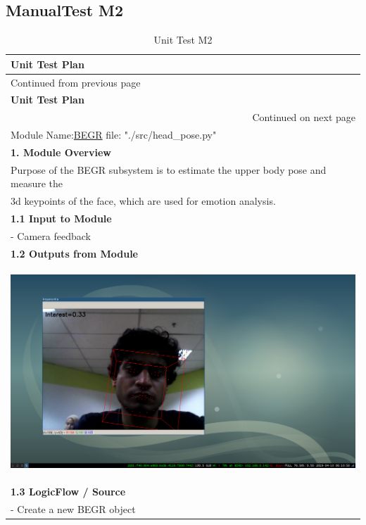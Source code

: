 \documentclass[12pt,a4paper,man]{report}
\begin{document}
\subsection{ManualTest M2}
\label{sec:orgb96a139}
\begin{longtable}{|p{7in}|}
\caption{\label{table:utest_m2}
Unit Test M2}
\\
\hline
\textbf{Unit Test Plan} \cellcolor{blue!25}\\
\hline
\endfirsthead
\multicolumn{1}{l}{Continued from previous page} \\
\hline

\textbf{Unit Test Plan} \cellcolor{blue!25} \\

\hline
\endhead
\hline\multicolumn{1}{r}{Continued on next page} \\
\endfoot
\endlastfoot
\hline
\hline
Module Name:\underline{BEGR} \hspace{2in}  file:  "./src/head\_pose.py"\\
\hline
\textbf{1. Module Overview}\\
\hline
Purpose of the BEGR subsystem is to estimate the upper body pose and measure the\\
3d keypoints of the face, which are used for emotion analysis.\\
\hline
\textbf{1.1 Input to Module}\\
\hline
- Camera feedback\\
\hline
\textbf{1.2 Outputs from Module}\\
\hline
\begin{center}
\includegraphics[width=.9\linewidth]{./ext_img/ext_2.png}
\end{center}\\
\hline
\textbf{1.3 LogicFlow / Source}\\
\hline
- Create a new BEGR object\\

\end{longtable}
\end{document}
